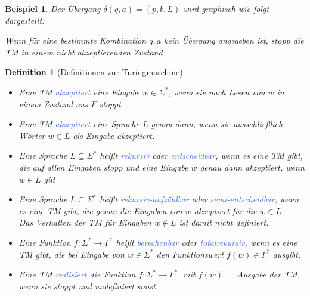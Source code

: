 \documentclass[11pt]{article}
\newcommand{\tcol}[1]{\textcolor{RoyalBlue}{#1}}
\theoremstyle{break}
\newtheorem{defi}[satz]{Definition}
\newtheorem{beis}[satz]{Beispiel}
\begin{document}
\begin{beis}
Der Übergang $\delta(q,a)=(p,b,L)$ wird graphisch wie folgt dargestellt:
\begin{center}
\end{center}
Wenn für eine bestimmte Kombination $q,a$ kein Übergang angegeben ist, stopp die TM in einem nicht akzeptierenden Zustand
\end{beis}

\begin{defi}[Definitionen zur Turingmaschine]
\begin{itemize}
\item Eine TM \tcol{akzeptiert} eine Eingabe $w\in\Sigma^*$, wenn sie nach Lesen von $w$ in einem Zustand aus $F$ stoppt
\item Eine TM \tcol{akzeptiert} eine Sprache $L$ genau dann, wenn sie ausschließlich Wörter $w\in L$ als Eingabe akzeptiert.
\item Eine Sprache $L\subseteq\Sigma^*$ heißt \tcol{rekursiv} oder \tcol{entscheidbar}, wenn es eine TM gibt, die auf allen Eingaben stopp und eine Eingabe $w$ genau dann akzeptiert, wenn $w\in L$ gilt
\item Eine Sprache $L\subseteq\Sigma^*$ heißt \tcol{rekursiv-aufzählbar} oder \tcol{semi-entscheidbar}, wenn es eine TM gibt, die genau die Eingaben von $w$ akzeptiert für die $w\in L$.\\
Das Verhalten der TM für Eingaben $w\notin L$ ist damit nicht definiert.
\item Eine Funktion $f\colon\Sigma^*\to\Gamma^*$ heißt \tcol{berechenbar} oder \tcol{totalrekursiv}, wenn es eine TM gibt, die bei Eingabe von $w\in\Sigma^*$ den Funktionswert $f(w)\in\Gamma^*$ ausgibt.
\item Eine TM \tcol{realisiert} die Funktion $f\colon\Sigma^*\to\Gamma^*$, mit $f(w)=$ Ausgabe der TM, wenn sie stoppt und undefiniert sonst.
\end{itemize}
\end{defi}
\end{document}
